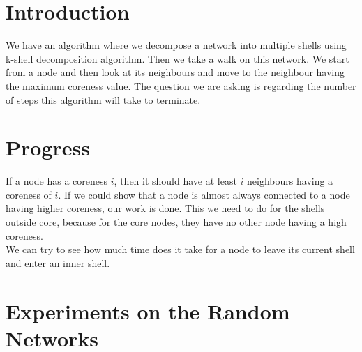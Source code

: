 \documentclass{exam}
\begin{document}
\begin{center}
\end{center}
 
\vspace{5mm}
 
 
%
% 
%

\section{Introduction}

We have an algorithm where we decompose a network into multiple shells using k-shell decomposition algorithm. Then we take a walk on this network. We start from a node and then look at its neighbours and move to the neighbour having the maximum coreness value. The question we are asking is regarding the number of steps this algorithm will take to terminate. 

\section{Progress}
If a node has a coreness $i$, then it should have at least $i$ neighbours having a coreness of $i$. If we could show that a node is almost always connected to a node having higher coreness, our work is done. This we need to do for the shells outside core, because for the core nodes, they have no other node having a high coreness. \\

We can try to see how much time does it take for a node to leave its current shell and enter an inner shell. 

\section{Experiments on the Random Networks}
\end{document}
